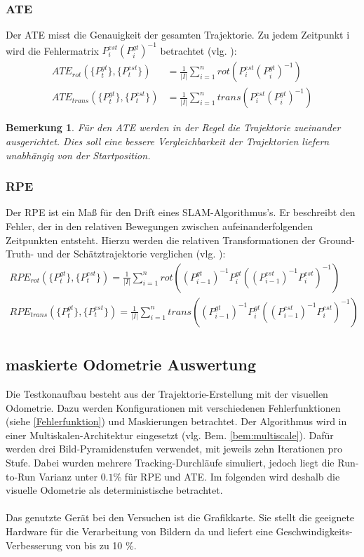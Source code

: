 \documentclass[12pt,DIV=15,BCOR=15mm,twoside,headsepline,abstract=true,listof=totoc,bibliography=totoc]{scrreprt}
\newtheorem{remark}{Bemerkung}[chapter]
\theoremstyle{remark}    %
\begin{document}
    \subsubsection{ATE}
    Der \ac{ATE} misst die Genauigkeit der gesamten Trajektorie. Zu jedem Zeitpunkt i wird die Fehlermatrix $P_i^{est}(P_i^{gt})^{-1}$ betrachtet (vlg. \cite{sturm12iros}): 
    \begin{align*}
        ATE_{rot}(\{P^{gt}_t\}, \{P^{est}_t\}) &= \frac{1}{|I|}\sum_{i = 1}^{n} rot(P_i^{est}(P_i^{gt})^{-1})\\
        ATE_{trans}(\{P^{gt}_t\}, \{P^{est}_t\}) &= \frac{1}{|I|}\sum_{i = 1}^{n} trans(P_i^{est}(P_i^{gt})^{-1})
    \end{align*}
    \begin{remark}
        Für den \ac{ATE} werden in der Regel die Trajektorie zueinander ausgerichtet. Dies soll eine bessere Vergleichbarkeit der Trajektorien liefern
        unabhängig von der Startposition.\cite{sturm12iros}
    \end{remark}

    \subsubsection{RPE}
    Der \ac{RPE} ist ein Maß für den Drift eines \ac{SLAM}-Algorithmus's. Er beschreibt den Fehler, der in den relativen Bewegungen zwischen aufeinanderfolgenden 
    Zeitpunkten entsteht. Hierzu werden die relativen Transformationen der Ground-Truth- und der Schätztrajektorie verglichen (vlg. \cite{sturm12iros}):
    \begin{align*}
        RPE_{rot}(\{P^{gt}_t\}, \{P^{est}_t\}) = \frac{1}{|I|} \sum_{i = 1}^{n} rot ((P_{i-1}^{gt})^{-1}P_{i}^{gt}\left((P^{est}_{i-1})^{-1}P^{est}_i\right)^{-1})\\
        RPE_{trans}(\{P^{gt}_t\}, \{P^{est}_t\}) = \frac{1}{|I|} \sum_{i = 1}^{n}  trans((P_{i-1}^{gt})^{-1}P_{i}^{gt}\left((P^{est}_{i-1})^{-1}P^{est}_i\right)^{-1})\\
    \end{align*}

    \subsection{maskierte Odometrie Auswertung} \label{sec:aus_vis_odom}
    Die Testkonaufbau besteht aus der Trajektorie-Erstellung mit der visuellen Odometrie. Dazu werden Konfigurationen mit verschiedenen Fehlerfunktionen 
    (siehe \ref{Fehlerfunktion}) und Maskierungen betrachtet.
    Der Algorithmus wird in einer Multiskalen-Architektur eingesetzt (vlg. Bem. \ref{bem:multiscale}). Dafür werden drei Bild-Pyramidenstufen verwendet, 
    mit jeweils zehn Iterationen pro Stufe. Dabei wurden mehrere Tracking-Durchläufe simuliert, jedoch liegt die Run-to-Run Varianz unter $0.1 \%$ 
    für \ac{RPE} und \ac{ATE}. Im folgenden wird deshalb die visuelle Odometrie als deterministische betrachtet.\\\\
    Das genutzte Gerät bei den Versuchen ist die Grafikkarte. Sie stellt die geeignete Hardware für die Verarbeitung von Bildern da und liefert 
    eine Geschwindigkeits-Verbesserung von bis zu 10 \%.
\end{document}
